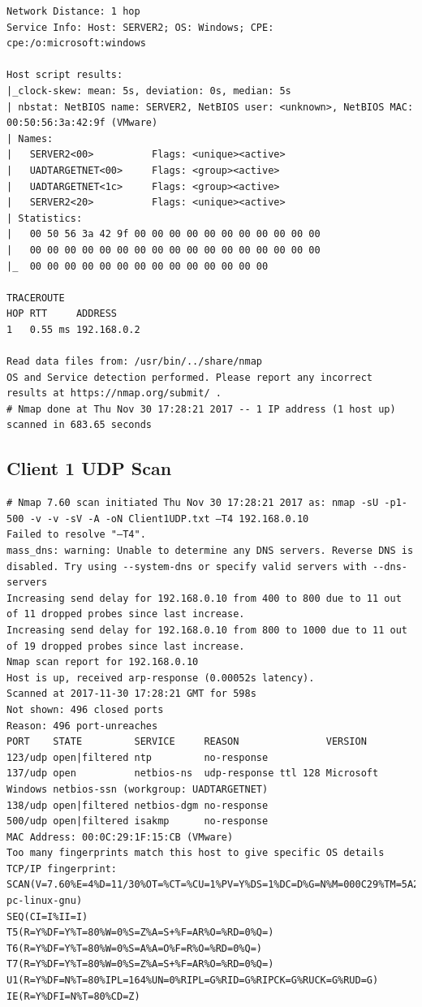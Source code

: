 \documentclass[12pt,a4paper]{article}
\begin{document}
\begin{appendices}
\begin{lstlisting}
Network Distance: 1 hop
Service Info: Host: SERVER2; OS: Windows; CPE: cpe:/o:microsoft:windows

Host script results:
|_clock-skew: mean: 5s, deviation: 0s, median: 5s
| nbstat: NetBIOS name: SERVER2, NetBIOS user: <unknown>, NetBIOS MAC: 00:50:56:3a:42:9f (VMware)
| Names:
|   SERVER2<00>          Flags: <unique><active>
|   UADTARGETNET<00>     Flags: <group><active>
|   UADTARGETNET<1c>     Flags: <group><active>
|   SERVER2<20>          Flags: <unique><active>
| Statistics:
|   00 50 56 3a 42 9f 00 00 00 00 00 00 00 00 00 00 00
|   00 00 00 00 00 00 00 00 00 00 00 00 00 00 00 00 00
|_  00 00 00 00 00 00 00 00 00 00 00 00 00 00

TRACEROUTE
HOP RTT     ADDRESS
1   0.55 ms 192.168.0.2

Read data files from: /usr/bin/../share/nmap
OS and Service detection performed. Please report any incorrect results at https://nmap.org/submit/ .
# Nmap done at Thu Nov 30 17:28:21 2017 -- 1 IP address (1 host up) scanned in 683.65 seconds
		\end{lstlisting}
	\subsection{Client 1 UDP Scan}
		\begin{lstlisting}
# Nmap 7.60 scan initiated Thu Nov 30 17:28:21 2017 as: nmap -sU -p1-500 -v -v -sV -A -oN Client1UDP.txt –T4 192.168.0.10
Failed to resolve "–T4".
mass_dns: warning: Unable to determine any DNS servers. Reverse DNS is disabled. Try using --system-dns or specify valid servers with --dns-servers
Increasing send delay for 192.168.0.10 from 400 to 800 due to 11 out of 11 dropped probes since last increase.
Increasing send delay for 192.168.0.10 from 800 to 1000 due to 11 out of 19 dropped probes since last increase.
Nmap scan report for 192.168.0.10
Host is up, received arp-response (0.00052s latency).
Scanned at 2017-11-30 17:28:21 GMT for 598s
Not shown: 496 closed ports
Reason: 496 port-unreaches
PORT    STATE         SERVICE     REASON               VERSION
123/udp open|filtered ntp         no-response
137/udp open          netbios-ns  udp-response ttl 128 Microsoft Windows netbios-ssn (workgroup: UADTARGETNET)
138/udp open|filtered netbios-dgm no-response
500/udp open|filtered isakmp      no-response
MAC Address: 00:0C:29:1F:15:CB (VMware)
Too many fingerprints match this host to give specific OS details
TCP/IP fingerprint:
SCAN(V=7.60%E=4%D=11/30%OT=%CT=%CU=1%PV=Y%DS=1%DC=D%G=N%M=000C29%TM=5A20420B%P=i686-pc-linux-gnu)
SEQ(CI=I%II=I)
T5(R=Y%DF=Y%T=80%W=0%S=Z%A=S+%F=AR%O=%RD=0%Q=)
T6(R=Y%DF=Y%T=80%W=0%S=A%A=O%F=R%O=%RD=0%Q=)
T7(R=Y%DF=Y%T=80%W=0%S=Z%A=S+%F=AR%O=%RD=0%Q=)
U1(R=Y%DF=N%T=80%IPL=164%UN=0%RIPL=G%RID=G%RIPCK=G%RUCK=G%RUD=G)
IE(R=Y%DFI=N%T=80%CD=Z)


\end{lstlisting}
\end{appendices}
\end{document}
